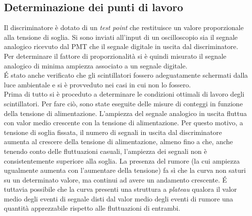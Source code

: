 \documentclass[11pt]{article}
\begin{document}
\subsection{Determinazione dei punti di lavoro}
Il discriminatore è dotato di un \textit{test point} che restituisce un valore proporzionale alla tensione di soglia. Si sono inviati all'input di un oscilloscopio sia il segnale analogico ricevuto dal PMT che il segnale digitale in uscita dal discriminatore. Per determinare il fattore di proporzionalità si è quindi misurato il segnale analogico di minima ampiezza associato a un segnale digitale. 
\\
\'E stato anche verificato che gli scintillatori fossero adeguatamente schermati dalla luce ambientale e si è provveduto nei casi in cui non lo fossero.
\\
Prima di tutto si è proceduto a determinare le condizioni ottimali di lavoro degli scintillatori. Per fare ciò, sono state eseguite delle misure di conteggi in funzione della tensione di alimentazione. L'ampiezza del segnale analogico in uscita fluttua con valor medio crescente con la tensione di alimentazione. Per questo motivo, a tensione di soglia fissata, il numero di segnali in uscita dal discriminatore aumenta al crescere della tensione di alimentazione, almeno fino a che, anche tenendo conto delle fluttuazioni casuali, l'ampiezza dei segnali non è consistentemente superiore alla soglia. La presenza del rumore (la cui ampiezza ugualmente aumenta con l'aumentare della tensione) fa sì che la curva non saturi su un determinato valore, ma continui ad avere un andamento crescente.
\'E tuttavia possibile che la curva presenti una struttura a \textit{plateau} qualora il valor medio degli eventi di segnale disti dal valor medio degli eventi di rumore una quantità apprezzabile rispetto alle fluttuazioni di entrambi. \newpage
\end{document}
